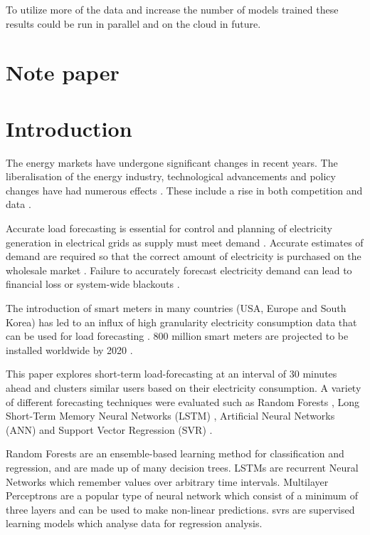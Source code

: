 To utilize more of the data and increase the number of models trained these results could be run in parallel and on the cloud in future.



\section{Note paper}

\section{Introduction}

The energy markets have undergone significant changes in recent years. The liberalisation of the energy industry, technological advancements and policy changes have had numerous effects \cite{Viegas2016}. These include a rise in both competition and data \cite{sioshansi_2009, Clastres2011}. %

Accurate load forecasting is essential for control and planning of electricity generation in electrical grids as supply must meet demand \cite{Lu1993}. Accurate estimates of demand are required so that the correct amount of electricity is purchased on the wholesale market \cite{Dillon1991}. Failure to accurately forecast electricity demand can lead to financial loss or system-wide blackouts \cite{Hines2008}.

The introduction of smart meters in many countries (USA, Europe and South Korea) has led to an influx of high granularity electricity consumption data that can be used for load forecasting \cite{Depuru2011a}. 800 million smart meters are projected to be installed worldwide by 2020 \cite{Telefonica2014}. 

This paper explores short-term load-forecasting at an interval of 30 minutes ahead and clusters similar users based on their electricity consumption. A variety of different forecasting techniques were evaluated such as Random Forests \cite{TinKamHo}, Long Short-Term Memory Neural Networks (LSTM) \cite{lstm}, Artificial Neural Networks \cite{book:984557} (ANN) and Support Vector Regression (SVR) \cite{Drucker1997}. 

Random Forests are an ensemble-based learning method for classification and regression, and are made up of many decision trees. LSTMs are recurrent Neural Networks which remember values over arbitrary time intervals. Multilayer Perceptrons are a popular type of neural network which consist of a minimum of three layers and can be used to make non-linear predictions. \acrshort{svr}s are supervised learning models which analyse data for regression analysis.

